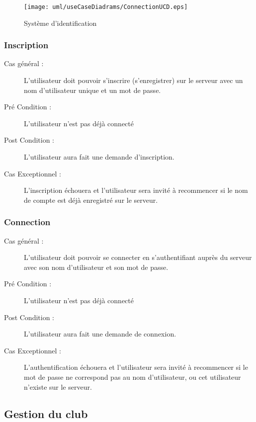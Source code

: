 \documentclass[a4paper]{report}
\begin{document}
\begin{figure}[H]
    \begin{center}
        \texttt{[image: uml/useCaseDiadrams/ConnectionUCD.eps]}
        \caption{\label{diag-use-inscription} Système d'identification}
    \end{center}
\end{figure}

\subsubsection{Inscription}

\begin{description}
    \item[Cas général  :] L'\gls{utilisateur} doit pouvoir s'inscrire (s'enregistrer) sur le \gls{serveur} avec un nom d'\gls{utilisateur} unique et un mot de passe.
    \item[Pré Condition  :] L'\gls{utilisateur} n'est pas déjà connecté
    \item[Post Condition :] L'\gls{utilisateur} aura fait une demande d'inscription.
    \item[Cas Exceptionnel :] L'inscription échouera et l'\gls{utilisateur} sera invité à recommencer si le nom de compte est déjà enregistré sur le \gls{serveur}.
\end{description}

\subsubsection{Connection}
\begin{description}
    \item[Cas général :] L'\gls{utilisateur} doit pouvoir se connecter en s'authentifiant auprès du \gls{serveur} avec son nom d'\gls{utilisateur} et son mot de passe.
    \item[Pré Condition  :] L'\gls{utilisateur} n'est pas déjà connecté
    \item[Post Condition :] L'\gls{utilisateur} aura fait une demande de connexion.
    \item[Cas Exceptionnel :] L'authentification échouera et l'\gls{utilisateur} sera invité à recommencer si le mot de passe ne correspond pas au nom d'\gls{utilisateur}, ou cet \gls{utilisateur} n'existe sur le \gls{serveur}.
\end{description}

\subsection{Gestion du club}
\end{document}
